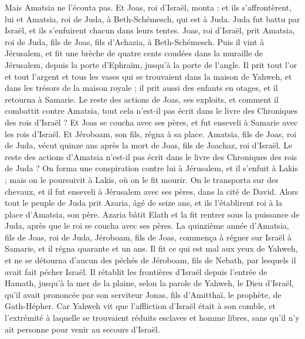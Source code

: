 \begin{multicols}{2}
Mais Amatsia ne l’écouta pas. Et Joas, roi d’Israël, monta : et ils s’affrontèrent, lui et Amatsia, roi de Juda, à Beth-Schémesch, qui est à Juda.
Juda fut battu par Israël, et ils s’enfuirent chacun dans leurs tentes.
Joas, roi d’Israël, prit Amatsia, roi de Juda, fils de Joas, fils d’Achazia, à Beth-Schémesch. Puis il vint à Jérusalem, et fit une brèche de quatre cents coudées dans la muraille de Jérusalem, depuis la porte d’Ephraïm, jusqu’à la porte de l’angle.
Il prit tout l’or et tout l’argent et tous les vases qui se trouvaient dans la maison de Yahweh, et dans les trésors de la maison royale ; il prit aussi des enfants en otages, et il retourna à Samarie.
Le reste des actions de Joas, ses exploits, et comment il combattit contre Amatsia, tout cela n’est-il pas écrit dans le livre des Chroniques des rois d’Israël ?
Et Joas se coucha avec ses pères, et fut enseveli à Samarie avec les rois d’Israël. Et Jéroboam, son fils, régna à sa place.
Amatsia, fils de Joas, roi de Juda, vécut quinze ans après la mort de Joas, fils de Joachaz, roi d’Israël.
Le reste des actions d’Amatsia n’est-il pas écrit dans le livre des Chroniques des rois de Juda ?
On forma une conspiration contre lui à Jérusalem, et il s’enfuit à Lakis ; mais on le poursuivit à Lakis, où on le fit mourir.
On le transporta sur des chevaux, et il fut enseveli à Jérusalem avec ses pères, dans la cité de David.
Alors tout le peuple de Juda prit Azaria, âgé de seize ans, et ils l’établirent roi à la place d’Amatsia, son père.
Azaria bâtit Elath et la fit rentrer sous la puissance de Juda, après que le roi se coucha avec ses pères.
La quinzième année d’Amatsia, fils de Joas, roi de Juda, Jéroboam, fils de Joas, commença à régner sur Israël à Samarie, et il régna quarante et un ans.
Il fit ce qui est mal aux yeux de Yahweh, et ne se détourna d’aucun des péchés de Jéroboam, fils de Nebath, par lesquels il avait fait pécher Israël.
Il rétablit les frontières d’Israël depuis l’entrée de Hamath, jusqu’à la mer de la plaine, selon la parole de Yahweh, le Dieu d’Israël, qu’il avait prononcée par son serviteur Jonas, fils d’Amitthaï, le prophète, de Gath-Hépher.
Car Yahweh vit que l’affliction d’Israël était à son comble, et l’extrémité à laquelle se trouvaient réduits esclaves et homme libres, sans qu’il n’y ait personne pour venir au secours d’Israël.

\end{multicols}

